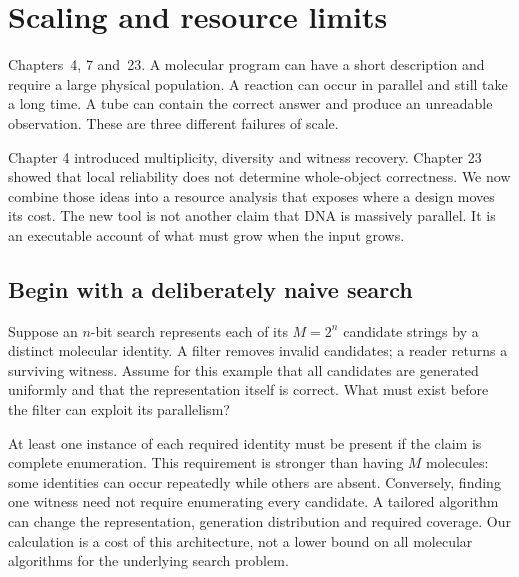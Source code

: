 \chapter{Scaling and resource limits}
\label{dnad24:chapter}
{Chapters~4, 7 and~23.}
A molecular program can have a short description and require a large physical
population. A reaction can occur in parallel and still take a long time. A tube
can contain the correct answer and produce an unreadable observation. These are
three different failures of scale.

Chapter 4 introduced multiplicity, diversity and witness recovery. Chapter 23
showed that local reliability does not determine whole-object correctness.
We now combine those ideas into a resource analysis that exposes where a design
moves its cost. The new tool is not another claim that DNA is massively parallel.
It is an executable account of what must grow when the input grows.

\section{Begin with a deliberately naive search}
Suppose an $n$-bit search represents each of its $M=2^n$ candidate strings by
a distinct molecular identity. A filter removes invalid candidates; a reader
returns a surviving witness. Assume for this example that all candidates are
generated uniformly and that the representation itself is correct.
What must exist before the filter can exploit its parallelism?

At least one instance of each required identity must be present if the claim is
complete enumeration. This requirement is stronger than having $M$ molecules:
some identities can occur repeatedly while others are absent. Conversely,
finding one witness need not require enumerating every candidate. A tailored
algorithm can change the representation, generation distribution and required
coverage. Our calculation is a cost of this architecture, not a lower bound on
all molecular algorithms for the underlying search problem.

